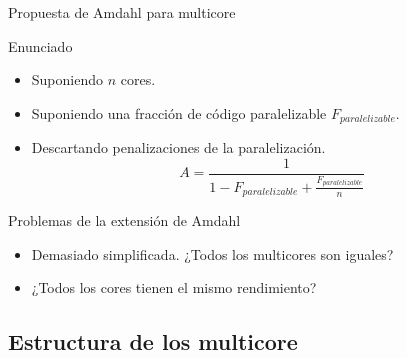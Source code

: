 \documentclass[utf8]{beamer}
\begin{document}
\begin{frame}{Propuesta de Amdahl para multicore}
    \begin{block}{Enunciado}
        \begin{itemize}
            \item Suponiendo $n$ cores.
            \item Suponiendo una fracción de código paralelizable $F_{paralelizable}$.
            \item Descartando penalizaciones de la paralelización.
            $$ A = \frac{1}{1 - F_{paralelizable} + \frac{F_{paralelizable}}{n}} $$ 
        \end{itemize}
    \end{block}
    \begin{block}{Problemas de la extensión de Amdahl}
        \begin{itemize}
            \item Demasiado simplificada. ¿Todos los multicores son iguales?
            \item ¿Todos los cores tienen el mismo rendimiento?
        \end{itemize}
    \end{block}
\end{frame}


\subsection*{Estructura de los multicore}
\end{document}
